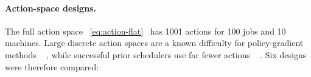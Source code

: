 \documentclass[12pt]{article}
\providecommand{\DIFaddtex}[1]{{\color{red}#1}} %
\providecommand{\DIFdeltex}[1]{} %
\providecommand{\DIFaddbegin}{} %
\providecommand{\DIFaddend}{} %
\providecommand{\DIFdelbegin}{} %
\providecommand{\DIFdelend}{} %
\providecommand{\DIFadd}[1]{\texorpdfstring{\DIFaddtex{#1}}{#1}} %
\providecommand{\DIFdel}[1]{\texorpdfstring{\DIFdeltex{#1}}{}} %
\providecommand{\DIFscaledelfig}{0.5}
\newlength{\DIFdelgraphicswidth} %
\newlength{\DIFdelgraphicsheight} %
\providecommand{\DIFaddincludegraphics}[2][]{{\color{blue}\fbox{\DIFOincludegraphics[#1]{#2}}}} %
\providecommand{\DIFdelincludegraphics}[2][]{%
\sbox{\DIFdelgraphicsbox}{\DIFOincludegraphics[#1]{#2}}%
\settoboxwidth{\DIFdelgraphicswidth}{\DIFdelgraphicsbox} %
\settoboxtotalheight{\DIFdelgraphicsheight}{\DIFdelgraphicsbox} %
\scalebox{\DIFscaledelfig}{%
\parbox[b]{\DIFdelgraphicswidth}{\usebox{\DIFdelgraphicsbox}\\[-\baselineskip] \rule{\DIFdelgraphicswidth}{0em}}\llap{\resizebox{\DIFdelgraphicswidth}{\DIFdelgraphicsheight}{%
\setlength{\unitlength}{\DIFdelgraphicswidth}%
\begin{picture}(1,1)%
\thicklines\linethickness{2pt} %
{\color[rgb]{1,0,0}\put(0,0){\framebox(1,1){}}}%
{\color[rgb]{1,0,0}\put(0,0){\line( 1,1){1}}}%
{\color[rgb]{1,0,0}\put(0,1){\line(1,-1){1}}}%
\end{picture}%
}\hspace*{3pt}}} %
} %
\DeclareRobustCommand{\DIFaddbegin}{\DIFOaddbegin \let\includegraphics\DIFaddincludegraphics} %
\DeclareRobustCommand{\DIFaddend}{\DIFOaddend \let\includegraphics\DIFOincludegraphics} %
\DeclareRobustCommand{\DIFdelbegin}{\DIFOdelbegin \let\includegraphics\DIFdelincludegraphics} %
\DeclareRobustCommand{\DIFdelend}{\DIFOaddend \let\includegraphics\DIFOincludegraphics} %
\begin{document}
\DIFdelbegin 
\addtocounter{subsection}{-1}%
\DIFdel{In this project, a variety of algorithms are examined, grouped into four categories. We summarise these algorithms as follows. }%


\addtocounter{subsubsection}{-1}%
\paragraph{\DIFdel{Reinforcement Learning.}} %
\addtocounter{paragraph}{-1}%
\DIFdel{All RL policy methods examined are actor-critic methods: A2C and PPO for their robustness and simplicity. We consider these algorithms under several action-space designs }\DIFdelend \DIFaddbegin \paragraph{\DIFadd{Action-space designs.}} \DIFadd{The full action space \mbox{%
\cref{eq:action-flat} }\hskip0pt%
has 1001 actions for 100 jobs and 10 machines. Large discrete action spaces are a known difficulty for policy-gradient methods \mbox{%
\cite{dulacarnold2015largeactionspaces}}\hskip0pt%
, while successful prior schedulers use far fewer actions \mbox{%
\cite{mao2016deeprm, mao2019decima}}\hskip0pt%
. Six designs were therefore compared}\DIFaddend :
\end{document}
